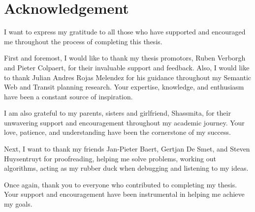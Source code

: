 \chapter*{Acknowledgement}

I want to express my gratitude to all those who have supported and encouraged me throughout the process of completing this thesis.

First and foremost, I would like to thank my thesis promotors, Ruben Verborgh and Pieter Colpaert, for their invaluable support and feedback. Also, I would like to thank Julian Andres Rojas Melendez for his guidance throughout my Semantic Web and Transit planning research. Your expertise, knowledge, and enthusiasm have been a constant source of inspiration.

I am also grateful to my parents, sisters and girlfriend, Shassmita, for their unwavering support and encouragement throughout my academic journey. Your love, patience, and understanding have been the cornerstone of my success.

Next, I want to thank my friends Jan-Pieter Baert, Gertjan De Smet, and Steven Huysentruyt for proofreading, helping me solve problems, working out algorithms, acting as my rubber duck when debugging and listening to my ideas.

Once again, thank you to everyone who contributed to completing my thesis. Your support and encouragement have been instrumental in helping me achieve my goals.
